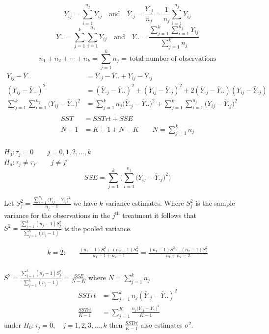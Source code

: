 \documentclass[11pt,a4paper]{article}
\theoremstyle{definition}
\begin{document}
$$Y_{ij}=\sum\limits^{n_j}_{i=1}Y_{ij}\quad  \text{and}\quad  \overline{Y}._{j}=\frac{Y._{j}}{n_j}=\frac{1}{n_j}\sum\limits^{n_j}_{i=1}Y_{ij}$$
$$Y{..}=\sum^k_{j=1}\sum^{n_j}_{i=1}Y_{ij}\quad  \text{and}\quad  \overline{Y}{..}=\frac{\sum\limits^k_{j=1}\sum\limits^{n_j}_{i=1}Y_{ij}}{\sum^k_{j=1}n_j}$$
$$n_1+n_2+\cdots +n_k=\sum^k_{j=1}n_j=\,\text{total number of observations}$$
\begin{align*}
Y_{ij}-\overline{Y}.. & = \overline{Y}._j-\overline{Y}..+Y_{ij}-\overline{Y}._j\\
(Y_{ij}-\overline{Y}..)^2 & = (\overline{Y}._j-\overline{Y}..)^2+(Y_{ij}-\overline{Y}._j)^2+2(\overline{Y}._j-\overline{Y}..)(Y_{ij}-\overline{Y}._j)\\
\sum^k_{j=1}\sum^{n_j}_{i=1}\big(Y_{ij}-\overline{Y}..\big)^2 & = \sum^k_{j=1}n_j\big(\overline{Y}._j-\overline{Y}..\big)^2+\sum^k_{j=1}\sum^{n_j}_{i=1}\big(Y_{ij}-\overline{Y}._j\big)^2\\
\end{align*}
\begin{align*}
SST  & = SSTrt + SSE\\
 N-1 & = K-1 + N-K\qquad  N=\sum^k_{j=1}n_j\\
\end{align*}


$H_0:\tau_j=0\qquad  j=0, 1,2,\ldots , k$\\

$H_a: \tau_j\neq \tau_{j'}\qquad  j\neq j'$\\

$$SSE = \sum^k_{j=1}\Bigg(\sum^{n_j}_{i=1}\big(Y_{ij}-\overline{Y}._j\big)^2\Bigg)$$


Let $S^2_j=\frac{\sum\limits^{n_j}_{i=1}\big(Y_{ij}-\overline{Y}._j\big)^2}{n_j-1}$ we have $k$ variance estimates. Where $S^2_j$ is the sample variance for the observations in the $j^{\text{th}}$ treatment it follows that $S^2=\frac{\sum\limits^k_{j=1}(n_j-1)S^2_j}{\sum\limits^k_{j=1}(n_j-1)}$ is the pooled variance.

\begin{align*}
k=2:\quad & \frac{(n_1-1)S^2_1+(n_2-1)S^2_2}{n_1-1+n_2-1}=\frac{(n_1-1)S^2_1+(n_2-1)S^2_2}{n_1+n_2-2}\\
\end{align*}

$S^2=\frac{\sum\limits^k_{j=1}(n_j-1)S^2_j}{\sum\limits^k_{j=1}(n_j-1)}=\frac{SSE}{N-K}$ where $N=\displaystyle{\sum^k_{j=1}n_j}$\\


\begin{align*}
SSTrt & = \sum^k_{j=1} n_j(\overline{Y}._j-\overline{Y}..)^2\\
\frac{SSTrt}{K-1} & = \sum^K_{j=1}\frac{n_j\big(\overline{Y}._j-\overline{Y}..\big)^2}{K-1}
\end{align*}
under $H_0:\tau_j = 0,\quad  j=1,2,3,\ldots ,k$ then $\frac{SSTrt}{K-1}$ also estimates $\sigma^2$.\\
\end{document}
